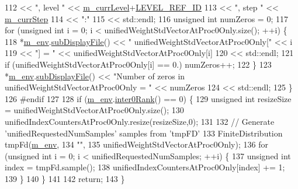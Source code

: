 \begin{DoxyCode}
112                             << \textcolor{stringliteral}{", level "} << \hyperlink{class_q_u_e_s_o_1_1_m_l_sampling_af9416874c856e50f3b35270e801f17e4}{m\_currLevel}+\hyperlink{_m_l_sampling_level_options_8h_a68d15eaf394d210effcf584b938206d3}{LEVEL\_REF\_ID}
113                             << \textcolor{stringliteral}{", step "}  << \hyperlink{class_q_u_e_s_o_1_1_m_l_sampling_a1b1f8ccb4823bdfa26ec652f0807c63e}{m\_currStep}
114                             << \textcolor{stringliteral}{":"}
115                             << std::endl;
116     \textcolor{keywordtype}{unsigned} \textcolor{keywordtype}{int} numZeros = 0;
117     \textcolor{keywordflow}{for} (\textcolor{keywordtype}{unsigned} \textcolor{keywordtype}{int} i = 0; i < unifiedWeightStdVectorAtProc0Only.size(); ++i) \{
118       *\hyperlink{class_q_u_e_s_o_1_1_m_l_sampling_a13f1ca4fe9f94822fe572a743eaced1d}{m\_env}.\hyperlink{class_q_u_e_s_o_1_1_base_environment_a8a0064746ae8dddfece4229b9ad374d6}{subDisplayFile}() << \textcolor{stringliteral}{"  unifiedWeightStdVectorAtProc0Only["} << i
119                               << \textcolor{stringliteral}{"] = "} << unifiedWeightStdVectorAtProc0Only[i]
120                               << std::endl;
121       \textcolor{keywordflow}{if} (unifiedWeightStdVectorAtProc0Only[i] == 0.) numZeros++;
122     \}
123     *\hyperlink{class_q_u_e_s_o_1_1_m_l_sampling_a13f1ca4fe9f94822fe572a743eaced1d}{m\_env}.\hyperlink{class_q_u_e_s_o_1_1_base_environment_a8a0064746ae8dddfece4229b9ad374d6}{subDisplayFile}() << \textcolor{stringliteral}{"Number of zeros in unifiedWeightStdVectorAtProc0Only = "}
       << numZeros
124                             << std::endl;
125   \}
126 \textcolor{preprocessor}{#endif}
127 \textcolor{preprocessor}{}
128   \textcolor{keywordflow}{if} (\hyperlink{class_q_u_e_s_o_1_1_m_l_sampling_a13f1ca4fe9f94822fe572a743eaced1d}{m\_env}.\hyperlink{class_q_u_e_s_o_1_1_base_environment_ae106b5bb8a80b655b88b3a26b1e7c185}{inter0Rank}() == 0) \{
129     \textcolor{keywordtype}{unsigned} \textcolor{keywordtype}{int} resizeSize = unifiedWeightStdVectorAtProc0Only.size();
130     unifiedIndexCountersAtProc0Only.resize(resizeSize,0);
131 
132     \textcolor{comment}{// Generate 'unifiedRequestedNumSamples' samples from 'tmpFD'}
133     FiniteDistribution tmpFd(\hyperlink{class_q_u_e_s_o_1_1_m_l_sampling_a13f1ca4fe9f94822fe572a743eaced1d}{m\_env},
134                                     \textcolor{stringliteral}{""},
135                                     unifiedWeightStdVectorAtProc0Only);
136     \textcolor{keywordflow}{for} (\textcolor{keywordtype}{unsigned} \textcolor{keywordtype}{int} i = 0; i < unifiedRequestedNumSamples; ++i) \{
137       \textcolor{keywordtype}{unsigned} \textcolor{keywordtype}{int} index = tmpFd.sample();
138       unifiedIndexCountersAtProc0Only[index] += 1;
139     \}
140   \}
141 
142   \textcolor{keywordflow}{return};
143 \}
\end{DoxyCode}


